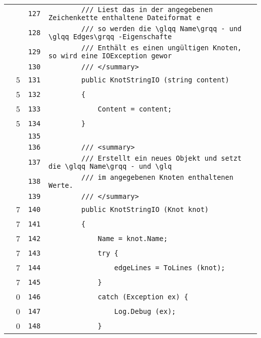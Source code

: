 \documentclass[a4paper,10pt]{article}
\begin{document}
\begin{longtable}[l]{lrrl}
\cellcolor{gray} &  & \verb~127~ & \verb~        /// Liest das in der angegebenen Zeichenkette enthaltene Dateiformat e~\\
\cellcolor{gray} &  & \verb~128~ & \verb~        /// so werden die \glqq Name\grqq - und \glqq Edges\grqq -Eigenschafte~\\
\cellcolor{gray} &  & \verb~129~ & \verb~        /// Enthält es einen ungültigen Knoten, so wird eine IOException gewor~\\
\cellcolor{gray} &  & \verb~130~ & \verb~        /// </summary>~\\
\cellcolor{green} & 5 & \verb~131~ & \verb~        public KnotStringIO (string content)~\\
\cellcolor{green} & 5 & \verb~132~ & \verb~        {~\\
\cellcolor{green} & 5 & \verb~133~ & \verb~            Content = content;~\\
\cellcolor{green} & 5 & \verb~134~ & \verb~        }~\\
\cellcolor{gray} &  & \verb~135~ & \verb~~\\
\cellcolor{gray} &  & \verb~136~ & \verb~        /// <summary>~\\
\cellcolor{gray} &  & \verb~137~ & \verb~        /// Erstellt ein neues Objekt und setzt die \glqq Name\grqq - und \glq~\\
\cellcolor{gray} &  & \verb~138~ & \verb~        /// im angegebenen Knoten enthaltenen Werte.~\\
\cellcolor{gray} &  & \verb~139~ & \verb~        /// </summary>~\\
\cellcolor{green} & 7 & \verb~140~ & \verb~        public KnotStringIO (Knot knot)~\\
\cellcolor{green} & 7 & \verb~141~ & \verb~        {~\\
\cellcolor{green} & 7 & \verb~142~ & \verb~            Name = knot.Name;~\\
\cellcolor{green} & 7 & \verb~143~ & \verb~            try {~\\
\cellcolor{green} & 7 & \verb~144~ & \verb~                edgeLines = ToLines (knot);~\\
\cellcolor{green} & 7 & \verb~145~ & \verb~            }~\\
\cellcolor{red} & 0 & \verb~146~ & \verb~            catch (Exception ex) {~\\
\cellcolor{red} & 0 & \verb~147~ & \verb~                Log.Debug (ex);~\\
\cellcolor{red} & 0 & \verb~148~ & \verb~            }~\\

\end{longtable}
\end{document}
